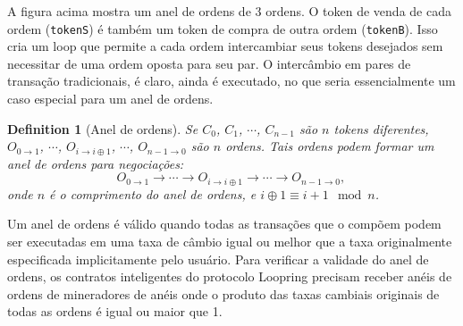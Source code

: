 \documentclass[UTF8,nofonts]{article}
\makeatletter
\newtheorem{definition}{Definition}[section]
\newenvironment{figurehere}
 {\def\@captype{figure}}
 {}
\makeatother
\begin{document}
\begin{multicols}{2}
\begin{center}
\begin{figurehere}

\caption{Um anel de ordens de 3 ordens}
\label{fig:ring}
\end{figurehere}
\end{center}

A figura acima mostra um anel de ordens de 3 ordens. O token de venda de cada ordem (\verb|tokenS|) é também um token de compra de outra ordem (\verb|tokenB|). Isso cria um loop que permite a cada ordem intercambiar seus tokens desejados sem necessitar de uma ordem oposta para seu par. O intercâmbio em pares de transação tradicionais, é claro, ainda é executado, no que seria essencialmente um caso especial para um anel de ordens.

\begin{definition}[Anel de ordens] Se $C_{0}$, $C_{1}$, $\cdots$, $C_{n-1}$ são $n$ tokens diferentes, $O_{0\rightarrow 1}$, $\cdots$, $O_{i\rightarrow i\oplus 1}$, $\cdots$, $O_{n-1 \rightarrow 0}$ são $n$ ordens. Tais ordens podem formar um anel de ordens para negociações:
$$O_{0\rightarrow 1} \rightarrow \cdots \rightarrow O_{i\rightarrow i\oplus 1} \rightarrow \cdots \rightarrow O_{n-1\rightarrow 0} \text{, }$$
onde $n$ é o comprimento do anel de ordens, e $i\oplus 1 \equiv i+1 \mod n$.
\end{definition}

Um anel de ordens é válido quando todas as transações que o compõem podem ser executadas em uma taxa de câmbio igual ou melhor que a taxa originalmente especificada implicitamente pelo usuário. Para verificar a validade do anel de ordens, os contratos inteligentes do protocolo Loopring precisam receber anéis de ordens de mineradores de anéis onde o produto das taxas cambiais originais de todas as ordens é igual ou maior que 1.


\end{multicols}
\end{document}
